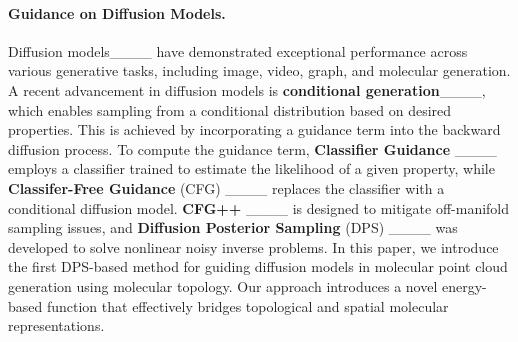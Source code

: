 \paragraph{Guidance on Diffusion Models.}
Diffusion models____ have demonstrated exceptional performance across various generative tasks, including image, video, graph, and molecular generation. A recent advancement in diffusion models is \textbf{conditional generation}____, which enables sampling from a conditional distribution based on desired properties. This is achieved by incorporating a guidance term into the backward diffusion process. To compute the guidance term, \textbf{Classifier Guidance} ____ employs a classifier trained to estimate the likelihood of a given property, while \textbf{Classifer-Free Guidance} (CFG) ____ replaces the classifier with a conditional diffusion model. \textbf{CFG++} ____ is designed to mitigate off-manifold sampling issues, and \textbf{Diffusion Posterior Sampling} (DPS) ____ was developed to solve nonlinear noisy inverse problems. In this paper, we introduce the first DPS-based method for guiding diffusion models in molecular point cloud generation using molecular topology. Our approach introduces a novel energy-based function that effectively bridges topological and spatial molecular representations.

